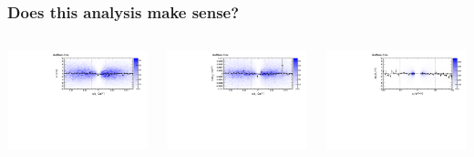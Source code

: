 \documentclass[compress]{beamer}
\begin{document}
\begin{frame}
\frametitle{Does this analysis make sense?}

\begin{columns}

\includegraphics[width=\linewidth]{residuals_ideal.pdf}

\includegraphics[width=\linewidth]{curvature_ideal.pdf}

\includegraphics[width=\linewidth]{momenta_ideal.pdf}


\end{columns}
\end{frame}
\end{document}
